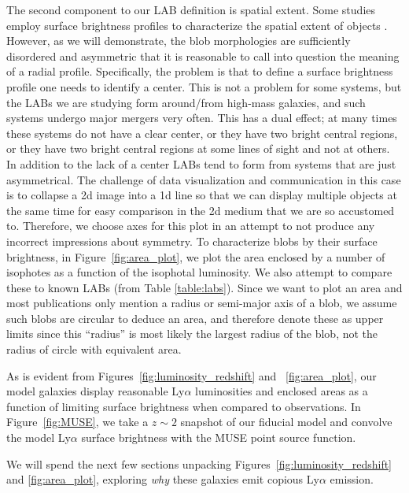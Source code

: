 The second component to our LAB definition is spatial extent.
Some studies employ surface brightness profiles to characterize the spatial extent of objects \citep[e.g.][]{Wisotzki2018, Steidel2011}.
However, as we will demonstrate, the blob morphologies are sufficiently disordered and asymmetric that it is reasonable to call into question the meaning of a radial profile.
Specifically, the problem is that to define a surface brightness profile one needs to identify a center.
This is not a problem for some systems, but the LABs we are studying form around/from high-mass galaxies, and such systems undergo major mergers very often.
This has a dual effect; at many times these systems do not have a clear center, or they have two bright central regions, or they have two bright central regions at some lines of sight and not at others.
In addition to the lack of a center LABs tend to form from systems that are just asymmetrical.
The challenge of data visualization and communication in this case is to collapse a 2d image into a 1d line so that we can display multiple objects at the same time for easy comparison in the 2d medium that we are so accustomed to.
Therefore, we choose axes for this plot in an attempt to not produce any incorrect impressions about symmetry.
To characterize blobs by their surface brightness, in Figure~\ref{fig:area_plot}, we plot the area enclosed by a number of isophotes as a function of the isophotal luminosity.
We also attempt to compare these to known LABs (from Table \ref{table:labs}).
Since we want to plot an area and most publications only mention a radius or semi-major axis of a blob, we assume such blobs are circular to deduce an area, and therefore denote these as upper limits since this ``radius'' is most likely the largest radius of the blob, not the radius of circle with equivalent area.

As is evident from Figures~\ref{fig:luminosity_redshift} and ~\ref{fig:area_plot}, our model galaxies display reasonable Ly$\alpha$ luminosities and enclosed areas as a function of limiting surface brightness when compared to observations.
In Figure~\ref{fig:MUSE}, we take a $z \sim 2$ snapshot of our fiducial model and convolve the model Ly$\alpha$ surface brightness with the MUSE point source function.

We will spend the next few sections unpacking Figures~\ref{fig:luminosity_redshift} and \ref{fig:area_plot}, exploring {\it why} these galaxies emit copious Ly$\alpha$ emission.

